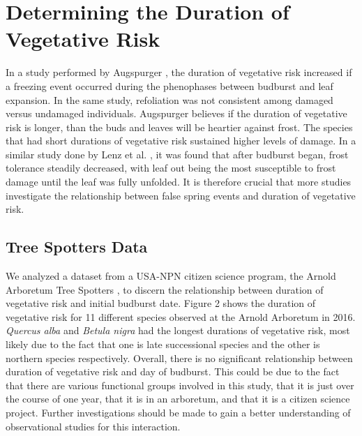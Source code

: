 \documentclass{article}\usepackage[]{graphicx}\usepackage[]{color}
\begin{document}
\section{Determining the Duration of Vegetative Risk}
In a study performed by Augspurger \citeyear{Augspurger2009}, the duration of vegetative risk increased if a freezing event occurred during the phenophases between budburst and leaf expansion. In the same study, refoliation was not consistent among damaged versus undamaged individuals. Augspurger believes if the duration of vegetative risk is longer, than the buds and leaves will be heartier against frost. The species that had short durations of vegetative risk sustained higher levels of damage. In a similar study done by Lenz et al. \citeyear{Lenz2016}, it was found that after budburst began, frost tolerance steadily decreased, with leaf out being the most susceptible to frost damage until the leaf was fully unfolded. It is therefore crucial that more studies investigate the relationship between false spring events and duration of vegetative risk. 

\subsection{Tree Spotters Data}
We analyzed a dataset from a USA-NPN citizen science program, the Arnold Arboretum Tree Spotters %
, to discern the relationship between duration of vegetative risk and initial budburst date. Figure 2 shows the duration of vegetative risk for 11 different species observed at the Arnold Arboretum in 2016. \textit{Quercus alba} and \textit{Betula nigra} had the longest durations of vegetative risk, most likely due to the fact that one is late successional species and the other is northern species respectively. Overall, there is no significant relationship between duration of vegetative risk and day of budburst. This could be due to the fact that there are various functional groups involved in this study, that it is just over the course of one year, that it is in an arboretum, and that it is a citizen science project. Further investigations should be made to gain a better understanding of observational studies for this interaction. 
\end{document}
